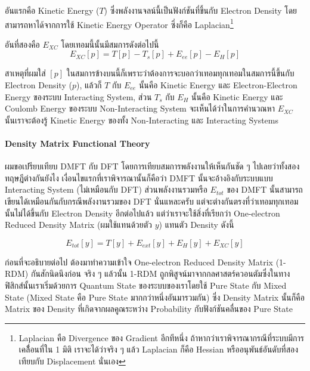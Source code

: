 อันแรกคือ Kinetic Energy ($T$) ซึ่งพลังงานจลน์นี้เป็นฟังก์ชันที่ขึ้นกับ Electron Density โดยสามารถหาได้จากการใช้ Kinetic Energy Operator ซึ่งก็คือ Laplacian\footnote{Laplacian คือ Divergence ของ Gradient อีกทีหนึ่ง ถ้าหากว่าเราพิจารณากรณีที่ระบบมีการเคลื่้อนที่ใน 1 มิติ เราจะได้ว่าจริง ๆ แล้ว Laplacian ก็คือ Hessian หรืออนุพันธ์อันดับที่สองเทียบกับ Displacement นั่นเอง}

อันที่สองคือ $E_{XC}$ โดยเทอมนี้นั้นมีสมการดังต่อไปนี้
%
\begin{equation}
  E_{XC}[p] 
  = 
  T[p]- T_{s}[p] + E_{ee}[p] - E_{H}[p]
\end{equation}

สาเหตุที่ผมใส่ $[p]$ ในสมการข้างบนนี้ก็เพราะว่าต้องการจะบอกว่าเทอมทุกเทอมในสมการนี้ขึ้นกับ Electron Density ($p$), แล้วก็ $T$ กับ $E_{ee}$ นั้นคือ Kinetic Energy และ Electron-Electron Energy ของระบบ Interacting System, ส่วน $T_{s}$ กับ $E_{H}$ นั้นคือ Kinetic Energy และ Coulomb Energy ของระบบ Non-Interacting System จะเห็นได้ว่าในการคำนวณหา $E_{XC}$ นั้นเราจะต้องรู้ Kinetic Energy ของทั้ง Non-Interacting และ Interacting Systems

\paragraph{Density Matrix Functional Theory}

ผมขอเปรียบเทียบ DMFT กับ DFT โดยการเทียบสมการพลังงานให้เห็นกันชัด ๆ ไปเลยว่าทั้งสองทฤษฎีต่างกันยังไง เงื่อนไขแรกที่เราพิจารณานั้นก็คือว่า DMFT นั้นจะอ้างอิงกับระบบแบบ Interacting System (ไม่เหมือนกับ DFT) ส่วนพลังงานรวมหรือ $E_{tot}$ ของ DMFT นั้นสามารถเขียนได้เหมือนกันกับกรณีพลังงานรวมของ DFT นั่นแหละครับ แต่จะต่างกันตรงที่ว่าเทอมทุกเทอมนั้นไม่ได้ขึ้นกับ Electron Density อีกต่อไปแล้ว แต่ว่าเราจะใช้สิ่งที่เรียกว่า One-electron Reduced Density Matrix (ผมใช้แทนด้วยตัว $y$) แทนตัว Density ดังนี้

\begin{equation}
  E_{tot}[y] = T[y] + E_{ext}[y] + E_{H}[y] + E_{XC}[y]
\end{equation}

ก่อนที่จะอธิบายต่อไป ต้องมาทำความเข้าใจ One-electron Reduced Density Matrix (1-RDM) กันสักนิดนึงก่อน จริง ๆ แล้วนั้น 1-RDM ถูกพิสูจน์มาจากกลศาสตร์ควอนตัมซึ่งในทางฟิสิกส์นั้นเราเริ่มด้วยการ Quantum State ของระบบของเราโดยใช้ Pure State กับ Mixed State (Mixed State คือ Pure State มากกว่าหนึ่งอันมารวมกัน) ซึ่ง Density Matrix นั้นก็คือ Matrix ของ Density ที่เกิดจากผลคูณระหว่าง Probability กับฟังก์ชันคลื่นของ Pure State

